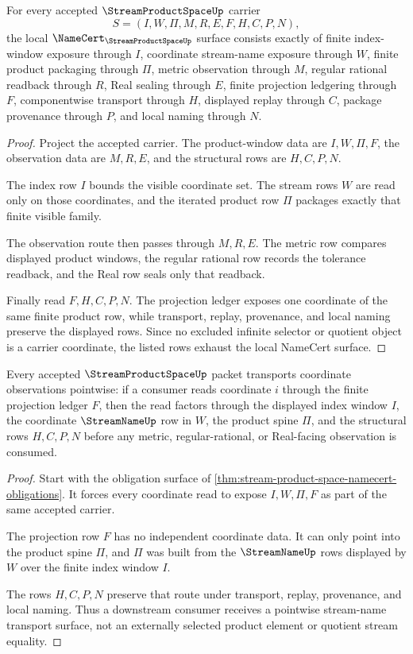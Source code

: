 \begin{theorem}
\label{thm:stream-product-space-namecert-obligations}
For every accepted $\StreamProductSpaceUp$ carrier
$$
S=(I,W,\Pi,M,R,E,F,H,C,P,N),
$$
the local $\NameCert_{\StreamProductSpaceUp}$ surface consists exactly of finite index-window exposure through $I$, coordinate stream-name exposure through $W$, finite product packaging through $\Pi$, metric observation through $M$, regular rational readback through $R$, Real sealing through $E$, finite projection ledgering through $F$, componentwise transport through $H$, displayed replay through $C$, package provenance through $P$, and local naming through $N$.
\end{theorem}
\begin{proof}
Project the accepted carrier. The product-window data are $I,W,\Pi,F$, the observation data are $M,R,E$, and the structural rows are $H,C,P,N$.

The index row $I$ bounds the visible coordinate set. The stream rows $W$ are read only on those coordinates, and the iterated product row $\Pi$ packages exactly that finite visible family.

The observation route then passes through $M,R,E$. The metric row compares displayed product windows, the regular rational row records the tolerance readback, and the Real row seals only that readback.

Finally read $F,H,C,P,N$. The projection ledger exposes one coordinate of the same finite product row, while transport, replay, provenance, and local naming preserve the displayed rows. Since no excluded infinite selector or quotient object is a carrier coordinate, the listed rows exhaust the local NameCert surface.
\end{proof}

\begin{theorem}
\label{thm:stream-product-space-pointwise-transport}
Every accepted $\StreamProductSpaceUp$ packet transports coordinate observations pointwise: if a consumer reads coordinate $i$ through the finite projection ledger $F$, then the read factors through the displayed index window $I$, the coordinate $\StreamNameUp$ row in $W$, the product spine $\Pi$, and the structural rows $H,C,P,N$ before any metric, regular-rational, or Real-facing observation is consumed.
\end{theorem}
\begin{proof}
Start with the obligation surface of \autoref{thm:stream-product-space-namecert-obligations}. It forces every coordinate read to expose $I,W,\Pi,F$ as part of the same accepted carrier.

The projection row $F$ has no independent coordinate data. It can only point into the product spine $\Pi$, and $\Pi$ was built from the $\StreamNameUp$ rows displayed by $W$ over the finite index window $I$.

The rows $H,C,P,N$ preserve that route under transport, replay, provenance, and local naming. Thus a downstream consumer receives a pointwise stream-name transport surface, not an externally selected product element or quotient stream equality.
\end{proof}

